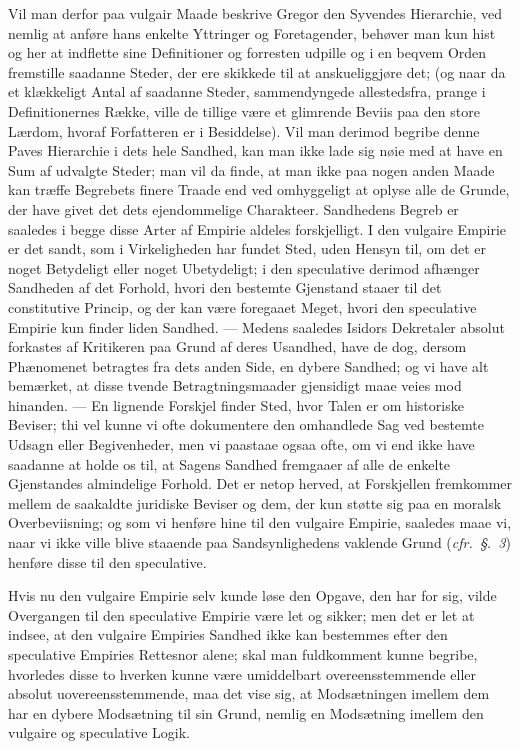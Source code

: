 \documentclass[12pt]{book}
\newcommand{\opage}[1]{\marginnote{\footnotesize\textit{[#1]}}}
\begin{document}
Vil man derfor paa vulgair Maade beskrive Gregor den Syvendes
Hierarchie, ved nemlig at anføre hans enkelte Yttringer og
Foretagender, behøver man kun hist og her at indflette sine
Definitioner og forresten udpille og i en beqvem Orden fremstille
saadanne Steder, der ere skikkede til at anskueliggjøre det; (og naar
da et klækkeligt Antal af saadanne Steder, sammendyngede allestedsfra,
prange i Definitionernes Række, ville de tillige være et glimrende
Beviis paa den store Lærdom, hvoraf Forfatteren er i Besiddelse). Vil
man derimod begribe denne Paves Hierarchie i dets hele Sandhed, kan
man ikke lade sig nøie med at have en Sum af udvalgte Steder; man vil
da finde, at man ikke paa nogen anden Maade kan træffe Begrebets
finere Traade end ved omhyggeligt at oplyse alle de Grunde, der have
givet det dets ejendommelige Charakteer. Sandhedens Begreb er saaledes
i begge disse Arter af Empirie aldeles forskjelligt. I den vulgaire
Empirie er det sandt, som i Virkeligheden har fundet Sted, uden Hensyn
til, om det er noget Betydeligt eller noget Ubetydeligt; i den
speculative derimod afhænger Sandheden
\opage{27} af det Forhold, hvori den bestemte Gjenstand staaer til det
constitutive Princip, og der kan være foregaaet Meget, hvori den
speculative Empirie kun finder liden Sandhed. --- Medens saaledes
Isidors Dekretaler absolut forkastes af Kritikeren paa Grund af deres
Usandhed, have de dog, dersom Phænomenet betragtes fra dets anden
Side, en dybere Sandhed; og vi have alt bemærket, at disse tvende
Betragtningsmaader gjensidigt maae veies mod hinanden. --- En lignende
Forskjel finder Sted, hvor Talen er om historiske Beviser; thi vel
kunne vi ofte dokumentere den omhandlede Sag ved bestemte Udsagn eller
Begivenheder, men vi paastaae ogsaa ofte, om vi end ikke have saadanne
at holde os til, at Sagens Sandhed fremgaaer af alle de enkelte
Gjenstandes almindelige Forhold. Det er netop herved, at Forskjellen
fremkommer mellem de saakaldte juridiske Beviser og dem, der kun
støtte sig paa en moralsk Overbeviisning; og som vi henføre hine til
den vulgaire Empirie, saaledes maae vi, naar vi ikke ville blive
staaende paa Sandsynlighedens vaklende Grund (\textit{cfr.~§.~3})
henføre disse til den speculative.

Hvis nu den vulgaire Empirie selv kunde løse den Opgave, den har for
sig, vilde Overgangen til den speculative Empirie være let og sikker;
men det er let at indsee, at den vulgaire Empiries Sandhed ikke kan
bestemmes efter den speculative Empiries Rettesnor alene; skal man
fuldkomment kunne begribe, hvorledes disse to hverken kunne være
umiddelbart overeensstemmende eller absolut uovereensstemmende, maa
det vise sig, at Modsætningen imellem dem har en dybere Modsætning til
sin Grund, nemlig en Modsætning imellem den vulgaire og speculative
Logik.
\end{document}
